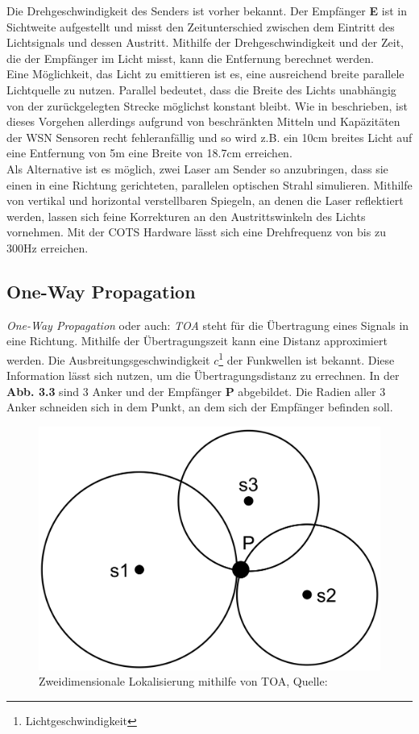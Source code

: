 \documentclass[12pt, a4wide]{scrreprt}
\begin{document}
Die Drehgeschwindigkeit des Senders ist vorher bekannt. Der Empfänger {\bf E} ist in Sichtweite aufgestellt und misst den Zeitunterschied zwischen dem Eintritt des Lichtsignals und dessen Austritt. Mithilfe der Drehgeschwindigkeit und der Zeit, die der Empfänger im Licht misst, kann die Entfernung berechnet werden.\\
\indent
Eine Möglichkeit, das Licht zu emittieren ist es, eine ausreichend breite parallele Lichtquelle zu nutzen. Parallel bedeutet, dass die Breite des Lichts unabhängig von der zurückgelegten Strecke möglichst konstant bleibt. Wie in \cite{lighthouse} beschrieben, ist dieses Vorgehen allerdings aufgrund von beschränkten Mitteln und Kapäzitäten der WSN Sensoren recht fehleranfällig und so wird z.B. ein 10cm breites Licht auf eine Entfernung von 5m eine Breite von 18.7cm erreichen.\\
\indent
Als Alternative ist es möglich, zwei Laser am Sender so anzubringen, dass sie einen in eine Richtung gerichteten, parallelen optischen Strahl simulieren. Mithilfe von vertikal und horizontal verstellbaren Spiegeln, an denen die Laser reflektiert werden, lassen sich feine Korrekturen an den Austrittswinkeln des Lichts vornehmen. Mit der \ac{COTS} Hardware lässt sich eine Drehfrequenz von bis zu 300Hz\cite{lighthouse} erreichen. 

    \subsection{One-Way Propagation}
\textit{One-Way Propagation} oder auch: \textit{\ac{TOA}} steht für die Übertragung eines Signals in eine Richtung\cite{toa}. Mithilfe der Übertragungszeit kann eine Distanz approximiert werden. Die Ausbreitungsgeschwindigkeit $c$\footnote{Lichtgeschwindigkeit} der Funkwellen ist bekannt. Diese Information lässt sich nutzen, um die Übertragungsdistanz zu errechnen. In der {\bf Abb. 3.3} sind 3 Anker und der Empfänger {\bf P} abgebildet. Die Radien aller 3 Anker schneiden sich in dem Punkt, an dem sich der Empfänger befinden soll.

\begin{figure}[!htb]
\centering
\includegraphics[scale=.07]{toa.png}
\caption{Zweidimensionale Lokalisierung mithilfe von TOA, Quelle:\cite{toa}}
\end{figure}
\end{document}
